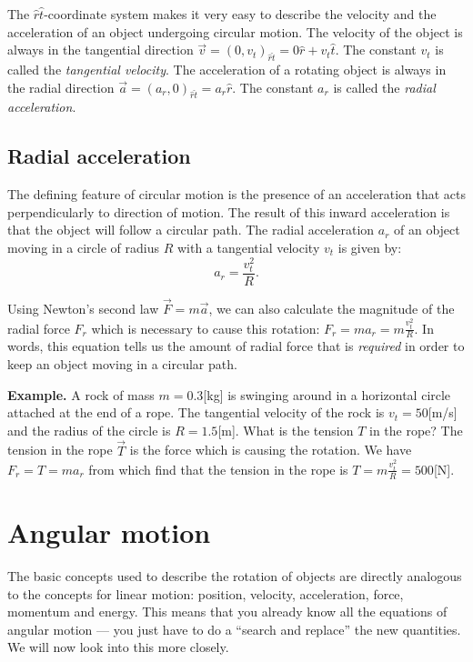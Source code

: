\documentclass[letterpaper,9pt,journal]{IEEEtran}
\newcommand{\be}{\begin{equation}}
\newcommand{\ee}{\end{equation}}
\begin{document}
The $\hat{r}\hat{t}$-coordinate system makes it very easy 
to describe the velocity and the acceleration of an object undergoing circular motion.
The velocity of the object is always in the tangential direction $\vec{v} =(0,v_t)_{\hat{r}\hat{t}}= 0\hat{r}+v_t \hat{t}$.
The constant $v_t$ is called the \emph{tangential velocity}. 
The acceleration of a rotating object is always in the radial direction 
$\vec{a}=(a_r,0)_{\hat{r}\hat{t}} = a_r \hat{r}$.
The constant $a_r$ is called the \emph{radial acceleration}.

\vspace{-3mm}
\subsection{Radial acceleration}

The defining feature of circular motion is the presence of an acceleration
that acts perpendicularly to direction of motion.
The result of this inward acceleration is that the object will follow a circular path.
The radial acceleration $a_r$ of an object moving in a circle of radius $R$
with a tangential velocity $v_t$ is given by:
\be
  a_r = \frac{v^2_t}{ R }.
  \label{RADIALa}
\ee

Using Newton's second law $\vec{F}=m\vec{a}$, we can also calculate the magnitude of the 
radial force $F_r$ which is necessary to cause this rotation: $F_{r} = ma_r = m \frac{v^2_t}{ R }$.
In words, this equation tells us the amount of radial force that is \emph{required} in order to keep an object moving
in a circular path. 

{\bf Example. }  A rock of mass $m=0.3$[kg] is swinging around in a horizontal circle attached at the end of a rope.
The tangential velocity of the rock is $v_t=50$[m/s] and the radius of the circle is $R=1.5$[m].
What is the tension $T$ in the rope?   The tension in the rope $\vec{T}$ is the force which is causing 
the rotation. We have $F_r =T = ma_r$ from which find that the tension in the rope is $T=m \frac{v^2_t}{ R }=500$[N].





\section{Angular motion}
\label{sec:angular-motion}

The basic concepts used to describe the rotation of objects %
are directly analogous to the concepts for linear motion:
position, velocity, acceleration, force, momentum and energy.
This means that you already know all the equations of angular motion --- 
you just have to do a ``search and replace'' the new quantities.
We will now look into this more closely.
\end{document}
